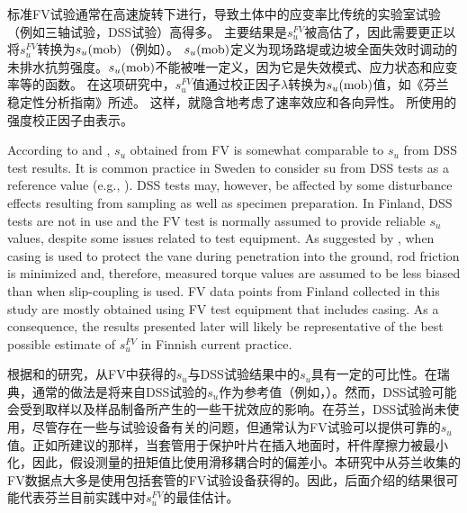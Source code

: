 \begin{ParaColumn}
    \switchcolumn

    标准FV试验通常在高速旋转下进行，导致土体中的应变率比传统的实验室试验（例如三轴试验，DSS试验）高得多。 主要结果是$s_{u}^{F V}$被高估了，因此需要更正以将$s_{u}^{F V}$转换为$s_u(\rm{mob})$（例如\citet{Bjerrum19721}）。 $s_u(\rm{mob})$定义为现场路堤或边坡全面失效时调动的未排水抗剪强度\citep{Bjerrum19721,Mesri20071}。$s_u(\rm{mob})$不能被唯一定义，因为它是失效模式、应力状态和应变率等的函数。 在这项研究中，$s_{u}^{F V}$值通过校正因子$\lambda$转换为$s_u(\rm{mob})$值，如《芬兰稳定性分析指南》\citep{Ratahallintokeskus2005}所述。 这样，就隐含地考虑了速率效应和各向异性。 所使用的强度校正因子由表示。 

    \switchcolumn*
    
    According to \citet{Jamiolkowski198557} and \citet{Chandler198813}, $s_u$ obtained from FV is somewhat comparable to $s_u$ from DSS test results. It is common practice in Sweden to consider su from DSS tests as a reference value (e.g., \citet{Westerberg201577}). DSS tests may, however, be affected by some disturbance effects resulting from sampling as well as specimen preparation. In Finland, DSS tests are not in use and the FV test is normally assumed to provide reliable $s_u$ values, despite some issues related to test equipment. As suggested by \citet{Mansikkamäki2015}, when casing is used to protect the vane during penetration into the ground, rod friction is minimized and, therefore, measured torque values are assumed to be less biased than when slip-coupling is used. FV data points from Finland collected in this study are mostly obtained using FV test equipment that includes casing. As a consequence, the results presented later will likely be representative of the best possible estimate of $s_{u}^{F V}$ in Finnish current practice.

    \switchcolumn

    根据\citet{Jamiolkowski198557}和\citet{Chandler198813}的研究，从FV中获得的$s_u$与DSS试验结果中的$s_u$具有一定的可比性。在瑞典，通常的做法是将来自DSS试验的$s_u$作为参考值（例如，\citet{Westerberg201577}）。然而，DSS试验可能会受到取样以及样品制备所产生的一些干扰效应的影响。在芬兰，DSS试验尚未使用，尽管存在一些与试验设备有关的问题，但通常认为FV试验可以提供可靠的$s_u$值。正如\citet{Mansikkamäki2015}所建议的那样，当套管用于保护叶片在插入地面时，杆件摩擦力被最小化，因此，假设测量的扭矩值比使用滑移耦合时的偏差小。本研究中从芬兰收集的FV数据点大多是使用包括套管的FV试验设备获得的。因此，后面介绍的结果很可能代表芬兰目前实践中对$s_{u}^{F V}$的最佳估计。


\end{ParaColumn}
